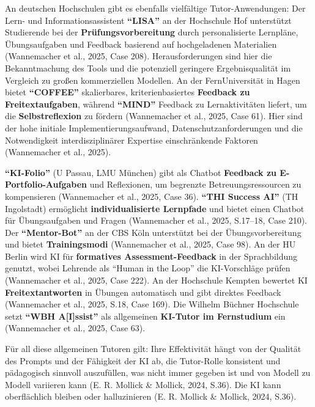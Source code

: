 \documentclass[
  ngerman,
  letterpaper,
  DIV=11]{scrreprt}
\begin{document}
An deutschen Hochschulen gibt es ebenfalls vielfältige
Tutor-Anwendungen: Der Lern- und Informationsassistent \textbf{``LISA''}
an der Hochschule Hof unterstützt Studierende bei der
\textbf{Prüfungsvorbereitung} durch personalisierte Lernpläne,
Übungsaufgaben und Feedback basierend auf hochgeladenen Materialien
(Wannemacher et al., 2025, Case 208). Herausforderungen sind hier die
Bekanntmachung des Tools und die potenziell geringere Ergebnisqualität
im Vergleich zu großen kommerziellen Modellen. An der FernUniversität in
Hagen bietet \textbf{``COFFEE''} skalierbares, kriterienbasiertes
\textbf{Feedback zu Freitextaufgaben}, während \textbf{``MIND''}
Feedback zu Lernaktivitäten liefert, um die \textbf{Selbstreflexion} zu
fördern (Wannemacher et al., 2025, Case 61). Hier sind der hohe initiale
Implementierungsaufwand, Datenschutzanforderungen und die Notwendigkeit
interdisziplinärer Expertise einschränkende Faktoren (Wannemacher et
al., 2025).

\textbf{``KI-Folio''} (U Passau, LMU München) gibt als Chatbot
\textbf{Feedback zu E-Portfolio-Aufgaben} und Reflexionen, um begrenzte
Betreuungsressourcen zu kompensieren (Wannemacher et al., 2025, Case
36). \textbf{``THI Success AI''} (TH Ingolstadt) ermöglicht
\textbf{individualisierte Lernpfade} und bietet einen Chatbot für
Übungsaufgaben und Fragen (Wannemacher et al., 2025, S.17--18, Case
210). Der \textbf{``Mentor-Bot''} an der CBS Köln unterstützt bei der
Übungsvorbereitung und bietet \textbf{Trainingsmodi} (Wannemacher et
al., 2025, Case 98). An der HU Berlin wird KI für \textbf{formatives
Assessment-Feedback} in der Sprachbildung genutzt, wobei Lehrende als
``Human in the Loop'' die KI-Vorschläge prüfen (Wannemacher et al.,
2025, Case 222). An der Hochschule Kempten bewertet KI
\textbf{Freitextantworten} in Übungen automatisch und gibt direktes
Feedback (Wannemacher et al., 2025, S.18, Case 169). Die Wilhelm Büchner
Hochschule setzt \textbf{``WBH A{[}I{]}ssist''} als allgemeinen
\textbf{KI-Tutor im Fernstudium} ein (Wannemacher et al., 2025, Case
63).

Für all diese allgemeinen Tutoren gilt: Ihre Effektivität hängt von der
Qualität des Prompts und der Fähigkeit der KI ab, die Tutor-Rolle
konsistent und pädagogisch sinnvoll auszufüllen, was nicht immer gegeben
ist und von Modell zu Modell variieren kann (E. R. Mollick \& Mollick,
2024, S.36). Die KI kann oberflächlich bleiben oder halluzinieren (E. R.
Mollick \& Mollick, 2024, S.36).
\end{document}
